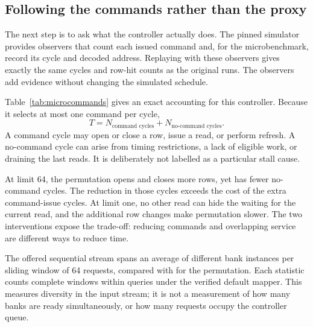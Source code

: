 \subsection{Following the commands rather than the proxy}
The next step is to ask what the controller actually does. The pinned simulator provides observers that count each issued command and, for the microbenchmark, record its cycle and decoded address. Replaying with these observers gives exactly the same cycles and row-hit counts as the original runs. The observers add evidence without changing the simulated schedule.

Table~\ref{tab:microcommands} gives an exact accounting for this controller. Because it selects at most one command per cycle,
\begin{equation}
 T = N_{\text{command cycles}} + N_{\text{no-command cycles}}.
\end{equation}
A command cycle may open or close a row, issue a read, or perform refresh. A no-command cycle can arise from timing restrictions, a lack of eligible work, or draining the last reads. It is deliberately not labelled as a particular stall cause.

\begin{table}[htbp]\centering\small
\caption[Command accounting for request order]{Controlled ordering experiment with command observers. ACT opens a row; PRE combines per-bank and all-bank precharge commands. The read count is 16,384 in every row. ``Limit'' is the maximum number of outstanding reads.}\label{tab:microcommands}

\end{table}

At limit 64, the permutation opens and closes more rows, yet has fewer no-command cycles. The reduction in those cycles exceeds the cost of the extra command-issue cycles. At limit one, no other read can hide the waiting for the current read, and the additional row changes make permutation slower. The two interventions expose the trade-off: reducing commands and overlapping service are different ways to reduce time.

The offered sequential stream spans an average of \SequentialBanks{} different bank instances per sliding window of 64 requests, compared with \RandomBanks{} for the permutation. Each statistic counts complete windows within queries under the verified default mapper. This measures diversity in the input stream; it is not a measurement of how many banks are ready simultaneously, or how many requests occupy the controller queue.

